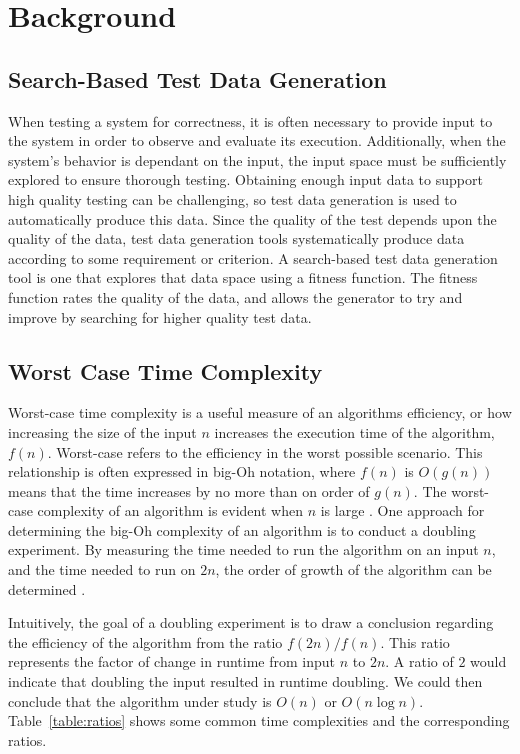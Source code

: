\section{Background}

\subsection{Search-Based Test Data Generation}
When testing a system for correctness, it is often necessary to
provide input to the system in order to observe and evaluate its
execution. Additionally, when the system's behavior is dependant on the
input, the input space must be sufficiently explored to ensure thorough
testing.  Obtaining enough input data to support high quality testing can
be challenging, so test data generation is used to automatically
produce this data. Since the quality of the test depends upon the
quality of the data, test data generation tools systematically produce data according
to some requirement or criterion. A search-based test data generation
tool is one that explores that data space using a fitness function.  The
fitness function rates the quality of the data, and allows the generator
to try and improve by searching for higher quality test data.

\subsection{Worst Case Time Complexity}

Worst-case time complexity is a useful measure of an algorithms
efficiency, or how increasing the size
of the input $n$ increases the execution time of the algorithm, $f(n)$.
Worst-case refers to the efficiency in the worst possible scenario.
This relationship is often expressed in big-Oh notation, where $f(n)$
is $O(g(n))$ means that the time increases by no more than on order of $g(n)$. The
worst-case complexity of an algorithm is evident when $n$ is large 
\cite{Goodrich:Data}. One approach for determining the big-Oh complexity
of an algorithm is to conduct a doubling experiment. By measuring the
time needed to run the algorithm on an input $n$, and the time needed to
run on $2n$, the order of growth of the algorithm can be determined \cite{Mcgeoch:Algorithmics,Sedgewick:Analysis}. 

Intuitively, the goal of a doubling experiment is to draw a conclusion
regarding the efficiency of the algorithm from the ratio
$f(2n)/f(n)$. This ratio represents the factor of change in runtime from
input $n$ to $2n$. A ratio of $2$ would indicate that doubling the
input resulted in runtime doubling. We could then conclude that the
algorithm under study is $O(n)$ or $O(n\log n)$.
Table~\ref{table:ratios} shows some common time complexities and the
corresponding ratios.

